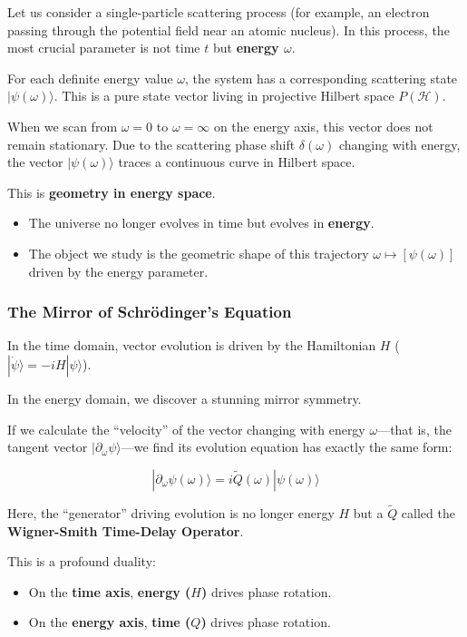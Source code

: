 Let us consider a single-particle scattering process (for example, an electron passing through the potential field near an atomic nucleus). In this process, the most crucial parameter is not time $t$ but \textbf{energy $\omega$}.

For each definite energy value $\omega$, the system has a corresponding scattering state $|\psi(\omega)\rangle$. This is a pure state vector living in projective Hilbert space $P(\mathcal{H})$.

When we scan from $\omega = 0$ to $\omega = \infty$ on the energy axis, this vector does not remain stationary. Due to the scattering phase shift $\delta(\omega)$ changing with energy, the vector $|\psi(\omega)\rangle$ traces a continuous curve in Hilbert space.

This is \textbf{geometry in energy space}.

\begin{itemize}
\item The universe no longer evolves in time but evolves in \textbf{energy}.

\item The object we study is the geometric shape of this trajectory $\omega \mapsto [\psi(\omega)]$ driven by the energy parameter.
\end{itemize}

\subsubsection{The Mirror of Schrödinger's Equation}

In the time domain, vector evolution is driven by the Hamiltonian $H$ ($|\dot{\psi}\rangle = -iH|\psi\rangle$).

In the energy domain, we discover a stunning mirror symmetry.

If we calculate the ``velocity'' of the vector changing with energy $\omega$---that is, the tangent vector $|\partial_\omega \psi\rangle$---we find its evolution equation has exactly the same form:

\[|\partial_\omega \psi(\omega)\rangle = i \tilde{Q}(\omega) |\psi(\omega)\rangle\]

Here, the ``generator'' driving evolution is no longer energy $H$ but a $\tilde{Q}$ called the \textbf{Wigner-Smith Time-Delay Operator}.

This is a profound duality:

\begin{itemize}
\item On the \textbf{time axis}, \textbf{energy ($H$)} drives phase rotation.

\item On the \textbf{energy axis}, \textbf{time ($Q$)} drives phase rotation.
\end{itemize}

